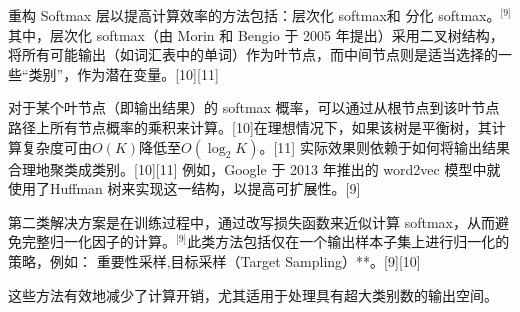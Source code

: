 重构 Softmax 层以提高计算效率的方法包括：层次化 softmax和 分化 softmax。\(^\text{[9]}\)其中，层次化 softmax（由 Morin 和 Bengio 于 2005 年提出）采用二叉树结构，将所有可能输出（如词汇表中的单词）作为叶节点，而中间节点则是适当选择的一些“类别”，作为潜在变量。[10][11]

对于某个叶节点（即输出结果）的 softmax 概率，可以通过从根节点到该叶节点路径上所有节点概率的乘积来计算。[10]在理想情况下，如果该树是平衡树，其计算复杂度可由$O(K)$降低至$O(\log_2 K)$。[11]  实际效果则依赖于如何将输出结果合理地聚类成类别。[10][11] 例如，Google 于 2013 年推出的 word2vec 模型中就使用了Huffman 树来实现这一结构，以提高可扩展性。[9]

第二类解决方案是在训练过程中，通过改写损失函数来近似计算 softmax，从而避免完整归一化因子的计算。\(^\text{[9]}\)此类方法包括仅在一个输出样本子集上进行归一化的策略，例如：  重要性采样,目标采样（Target Sampling）**。[9][10]  

这些方法有效地减少了计算开销，尤其适用于处理具有超大类别数的输出空间。
$$
